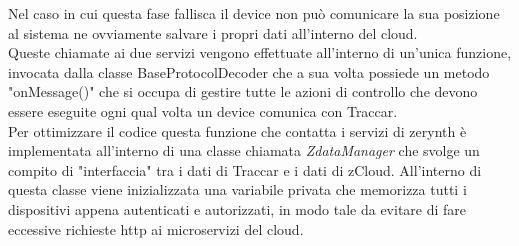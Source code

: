 \documentclass[a4paper,titlepage,12pt]{book}
\begin{document}
Nel caso in cui questa fase fallisca il device non può comunicare la sua posizione al sistema ne ovviamente salvare i propri dati all'interno del cloud. \\
Queste chiamate ai due servizi vengono effettuate all'interno di un'unica funzione, invocata dalla classe BaseProtocolDecoder che a sua volta possiede un metodo "onMessage()" che si occupa di gestire tutte le azioni di controllo che devono essere eseguite ogni qual volta un device comunica con Traccar.\\
Per ottimizzare il codice questa funzione che contatta i servizi di zerynth è implementata all'interno di una classe chiamata \textit{ZdataManager} che svolge un compito di "interfaccia" tra i dati di Traccar e i dati di zCloud. All'interno di questa classe viene inizializzata una variabile privata che memorizza tutti i dispositivi appena autenticati e autorizzati, in modo tale da evitare di fare eccessive richieste http ai microservizi del cloud.\\
\end{document}

